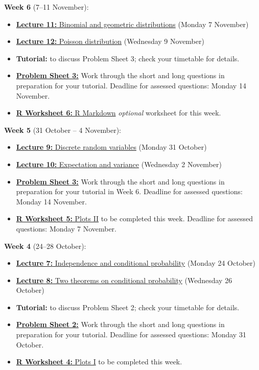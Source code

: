 \documentclass[
  a4paper,
]{book}
\providecommand{\tightlist}{%
  \setlength{\itemsep}{0pt}\setlength{\parskip}{0pt}}
\theoremstyle{definition}
\theoremstyle{definition}
\theoremstyle{definition}
\theoremstyle{definition}
\theoremstyle{remark}
\begin{document}
\textbf{Week 6} (7--11 November):

\begin{itemize}
\tightlist
\item
  \protect\hyperlink{L11-binomial-geometric}{\textbf{Lecture 11:} Binomial and geometric distributions} (Monday 7 November)
\item
  \protect\hyperlink{L12-poisson}{\textbf{Lecture 12:} Poisson distribution} (Wednesday 9 November)
\item
  \textbf{Tutorial:} to discuss Problem Sheet 3; check your timetable for details.
\item
  \protect\hyperlink{P3}{\textbf{Problem Sheet 3:}} Work through the short and long questions in preparation for your tutorial. Deadline for assessed questions: Monday 14 November.
\item
  \protect\hyperlink{r-work}{\textbf{R Worksheet 6:} R Markdown} \emph{optional} worksheet for this week.
\end{itemize}

\textbf{Week 5} (31 October -- 4 November):

\begin{itemize}
\tightlist
\item
  \protect\hyperlink{L09-discrete-rv}{\textbf{Lecture 9:} Discrete random variables} (Monday 31 October)
\item
  \protect\hyperlink{L10-expectation}{\textbf{Lecture 10:} Expectation and variance} (Wednesday 2 November)
\item
  \protect\hyperlink{P3}{\textbf{Problem Sheet 3:}} Work through the short and long questions in preparation for your tutorial in Week 6. Deadline for assessed questions: Monday 14 November.
\item
  \protect\hyperlink{r-work}{\textbf{R Worksheet 5:} Plots II} to be completed this week. Deadline for assessed questions: Monday 7 November.
\end{itemize}

\textbf{Week 4} (24--28 October):

\begin{itemize}
\tightlist
\item
  \protect\hyperlink{L07-conditional}{\textbf{Lecture 7:} Independence and conditional probability} (Monday 24 October)
\item
  \protect\hyperlink{L08-two-theorems}{\textbf{Lecture 8:} Two theorems on conditional probability} (Wednesday 26 October)
\item
  \textbf{Tutorial:} to discuss Problem Sheet 2; check your timetable for details.
\item
  \protect\hyperlink{P2}{\textbf{Problem Sheet 2:}} Work through the short and long questions in preparation for your tutorial. Deadline for assessed questions: Monday 31 October.
\item
  \protect\hyperlink{r-work}{\textbf{R Worksheet 4:} Plots I} to be completed this week.
\end{itemize}
\end{document}

